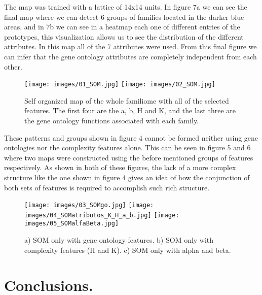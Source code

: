 \documentclass[preprint,12pt]{elsarticle}
\begin{document}
The map was trained with a lattice of 14x14 units. In figure 7a we can see the final map where we can detect 6 groups of families located in the darker blue areas, and in 7b we can see in a heatmap each one of different entries of the prototypes, this visualization allows us to see the distribution of the different attributes. In this map all of the 7 attributes were used.
From this final figure we can infer that the gene ontology attributes are completely independent from each other. 


\begin{figure}
  \texttt{[image: images/01\_SOM.jpg]}
  \label{fig:som}
\endminipage\hfill
{}
  \texttt{[image: images/02\_SOM.jpg]}
  \label{fig:heatmap}
\endminipage
\caption{Self organized map of the whole familiome with all of the selected features. The first four are the a, b, H and K, and the last three are the gene ontology functions associated with each family. }
\end{figure}

\bigbreak
These patterns and groups shown in figure 4 cannot be formed neither using gene ontologies  nor the complexity features alone. This can be seen in figure 5 and 6 where two maps were constructed using the before mentioned groups of features respectively.  As shown in both of these figures, the lack of a more complex structure like the one shown in figure 4 gives an idea of how the conjunction of both sets of features is required to accomplish such rich structure.

\bigbreak

\begin{figure}
  \texttt{[image: images/03\_SOMgo.jpg]}
  \label{fig:som}
\endminipage\hfill
{}
  \texttt{[image: images/04\_SOMatributos\_K\_H\_a\_b.jpg]}
  \label{fig:heatmap}
\endminipage\hfill
{}
  \texttt{[image: images/05\_SOMalfaBeta.jpg]}
  \label{fig:heatmap}
\endminipage
\caption{a) SOM only with gene ontology features. b) SOM only with complexity features (H and K). c) SOM only with alpha and beta.}
\end{figure}


\bigbreak


\section{\textbf{Conclusions.}}
\label{S:1}
\end{document}
